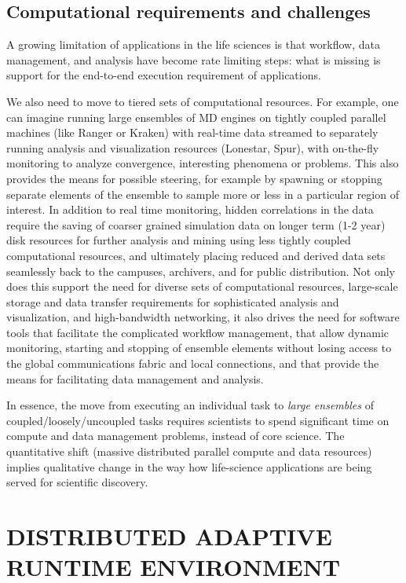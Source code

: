 \documentclass{sig-alternate}
\begin{document}
\subsection{Computational requirements and challenges}

A growing limitation of applications in the life sciences is that workflow, data management, and
analysis have become rate limiting steps: what is missing is support for the end-to-end execution requirement of applications.

We also need to move to tiered sets of computational resources.  For
example, one can imagine running large ensembles of MD engines on
tightly coupled parallel machines (like Ranger or Kraken) with
real-time data streamed to separately running analysis and
visualization resources (Lonestar, Spur), with on-the-fly monitoring
to analyze convergence, interesting phenomena or problems.  This also
provides the means for possible steering, for example by spawning or
stopping separate elements of the ensemble to sample more or less in a
particular region of interest.  In addition to real time monitoring,
hidden correlations in the data require the saving of coarser grained
simulation data on longer term (1-2 year) disk resources for further
analysis and mining using less tightly coupled computational
resources, and ultimately placing reduced and derived data sets
seamlessly back to the campuses, archivers, and for public
distribution.  Not only does this support the need for diverse sets of
computational resources, large-scale storage and data transfer
requirements for sophisticated analysis and visualization, and
high-bandwidth networking, it also drives the need for software tools
that facilitate the complicated workflow management, that allow
dynamic monitoring, starting and stopping of ensemble elements without
losing access to the global communications fabric and local
connections, and that provide the means for facilitating data
management and analysis.

In essence, the move from executing an individual task to
\textit{large ensembles} of coupled/loosely/uncoupled tasks requires
scientists to spend significant time on compute and data management
problems, instead of core science.  The quantitative shift (massive
distributed parallel compute and data resources) implies qualitative
change in the way how life-science applications are being served for
scientific discovery.


\section{DISTRIBUTED ADAPTIVE RUNTIME ENVIRONMENT}
\end{document}
